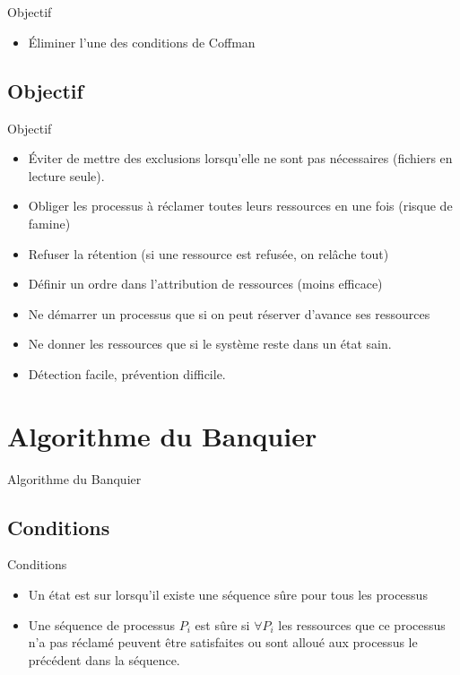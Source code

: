 \section{\sectitle}
\begin{frame}{\sectitle}
\def\subsectitle{Objectif}

\begin{alertblock}{\subsectitle}
\begin{itemize}
    \item Éliminer l'une des conditions de Coffman
\end{itemize}
\end{alertblock}


\subsection{\subsectitle}
\begin{block}{\subsectitle}
\begin{itemize}
    \item Éviter de mettre des exclusions lorsqu'elle ne sont pas nécessaires
    (fichiers en lecture seule).
    \item Obliger les processus à réclamer toutes leurs ressources en une fois
    (risque de famine)
    \item Refuser la rétention (si une ressource est refusée, on relâche tout)
    \item Définir un ordre dans l'attribution de ressources (moins efficace)
    \item Ne démarrer un processus que si on peut réserver d'avance ses
    ressources
    \item Ne donner les ressources que si le système reste dans un état sain.
    \item Détection facile, prévention difficile.
\end{itemize}
\end{block}
\end{frame}


\def\sectitle{Algorithme du Banquier}
\section{\sectitle}
\begin{frame}{\sectitle}
\def\subsectitle{Conditions}
\subsection{\subsectitle}
\begin{block}{\subsectitle}
\begin{itemize}
    \item Un état est sur lorsqu'il existe une séquence sûre pour tous les
    processus
    \item Une séquence de processus $P_{i}$ est sûre si $\forall P_{i}$ les
    ressources que ce processus n'a pas réclamé peuvent être satisfaites ou sont
    alloué aux processus le précédent dans la séquence.
\end{itemize}
\end{block}
\end{frame}

